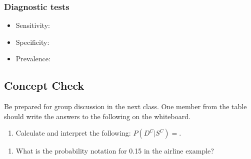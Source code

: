 \documentclass[
]{report}
\providecommand{\tightlist}{%
  \setlength{\itemsep}{0pt}\setlength{\parskip}{0pt}}
\begin{document}
\vspace{1in}

\subsubsection*{Diagnostic tests}\label{diagnostic-tests}

\begin{itemize}
\tightlist
\item
  Sensitivity:
\end{itemize}

\vspace{0.3in}

\begin{itemize}
\tightlist
\item
  Specificity:
\end{itemize}

\vspace{0.3in}

\begin{itemize}
\tightlist
\item
  Prevalence:
\end{itemize}

\vspace{0.3in}

\subsection{Concept Check}\label{concept-check-2}

Be prepared for group discussion in the next class. One member from the table should write the answers to the following on the whiteboard.

\begin{enumerate}
\def\labelenumi{\arabic{enumi}.}
\tightlist
\item
  Calculate and interpret the following: \(P(D^C|S^C)=\).
\end{enumerate}

\vspace{1in}

\begin{enumerate}
\def\labelenumi{\arabic{enumi}.}
\setcounter{enumi}{1}
\tightlist
\item
  What is the probability notation for 0.15 in the airline example?
\end{enumerate}

\vspace{1in}
\end{document}
